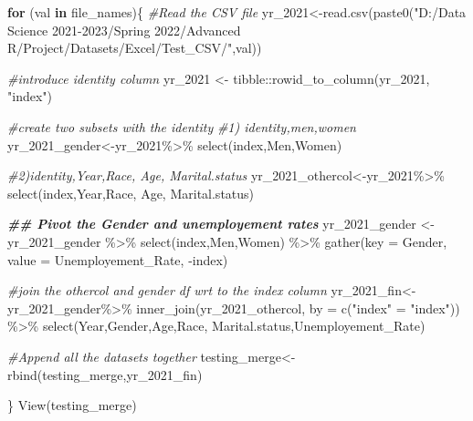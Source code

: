 \documentclass[
]{article}
\newenvironment{Shaded}{\begin{snugshade}}{\end{snugshade}}
\newcommand{\AttributeTok}[1]{\textcolor[rgb]{0.77,0.63,0.00}{#1}}
\newcommand{\CommentTok}[1]{\textcolor[rgb]{0.56,0.35,0.01}{\textit{#1}}}
\newcommand{\ControlFlowTok}[1]{\textcolor[rgb]{0.13,0.29,0.53}{\textbf{#1}}}
\newcommand{\DocumentationTok}[1]{\textcolor[rgb]{0.56,0.35,0.01}{\textbf{\textit{#1}}}}
\newcommand{\FunctionTok}[1]{\textcolor[rgb]{0.00,0.00,0.00}{#1}}
\newcommand{\NormalTok}[1]{#1}
\newcommand{\OtherTok}[1]{\textcolor[rgb]{0.56,0.35,0.01}{#1}}
\newcommand{\SpecialCharTok}[1]{\textcolor[rgb]{0.00,0.00,0.00}{#1}}
\newcommand{\StringTok}[1]{\textcolor[rgb]{0.31,0.60,0.02}{#1}}
\begin{document}
\begin{Shaded}
\begin{Highlighting}[]
\ControlFlowTok{for}\NormalTok{ (val }\ControlFlowTok{in}\NormalTok{ file\_names)\{}
  \CommentTok{\#Read the CSV file}
\NormalTok{  yr\_2021}\OtherTok{\textless{}{-}}\FunctionTok{read.csv}\NormalTok{(}\FunctionTok{paste0}\NormalTok{(}\StringTok{"D:/Data Science 2021{-}2023/Spring 2022/Advanced R/Project/Datasets/Excel/Test\_CSV/"}\NormalTok{,val))}
  
  \CommentTok{\#introduce identity column}
\NormalTok{  yr\_2021 }\OtherTok{\textless{}{-}}\NormalTok{ tibble}\SpecialCharTok{::}\FunctionTok{rowid\_to\_column}\NormalTok{(yr\_2021, }\StringTok{"index"}\NormalTok{)}
  
  \CommentTok{\#create two subsets with the identity }
  \CommentTok{\#1) identity,men,women }
\NormalTok{  yr\_2021\_gender}\OtherTok{\textless{}{-}}\NormalTok{yr\_2021}\SpecialCharTok{\%\textgreater{}\%}
    \FunctionTok{select}\NormalTok{(index,Men,Women)}
  
  \CommentTok{\#2)identity,Year,Race, Age, Marital.status}
\NormalTok{  yr\_2021\_othercol}\OtherTok{\textless{}{-}}\NormalTok{yr\_2021}\SpecialCharTok{\%\textgreater{}\%}
    \FunctionTok{select}\NormalTok{(index,Year,Race, Age, Marital.status)}
  
  \DocumentationTok{\#\# Pivot the Gender and unemployement rates}
\NormalTok{  yr\_2021\_gender }\OtherTok{\textless{}{-}}\NormalTok{ yr\_2021\_gender }\SpecialCharTok{\%\textgreater{}\%}
    \FunctionTok{select}\NormalTok{(index,Men,Women) }\SpecialCharTok{\%\textgreater{}\%}
    \FunctionTok{gather}\NormalTok{(}\AttributeTok{key =}\NormalTok{ Gender, }\AttributeTok{value =}\NormalTok{ Unemployement\_Rate, }\SpecialCharTok{{-}}\NormalTok{index)}

  \CommentTok{\#join the othercol and gender df wrt to the index column}
\NormalTok{  yr\_2021\_fin}\OtherTok{\textless{}{-}}\NormalTok{yr\_2021\_gender}\SpecialCharTok{\%\textgreater{}\%}
    \FunctionTok{inner\_join}\NormalTok{(yr\_2021\_othercol, }\AttributeTok{by =} \FunctionTok{c}\NormalTok{(}\StringTok{"index"} \OtherTok{=} \StringTok{"index"}\NormalTok{)) }\SpecialCharTok{\%\textgreater{}\%} 
    \FunctionTok{select}\NormalTok{(Year,Gender,Age,Race, Marital.status,Unemployement\_Rate)}
  
  \CommentTok{\#Append all the datasets together}
\NormalTok{  testing\_merge}\OtherTok{\textless{}{-}}\FunctionTok{rbind}\NormalTok{(testing\_merge,yr\_2021\_fin)}
  
\NormalTok{\}}
\FunctionTok{View}\NormalTok{(testing\_merge)}
\end{Highlighting}
\end{Shaded}
\end{document}
